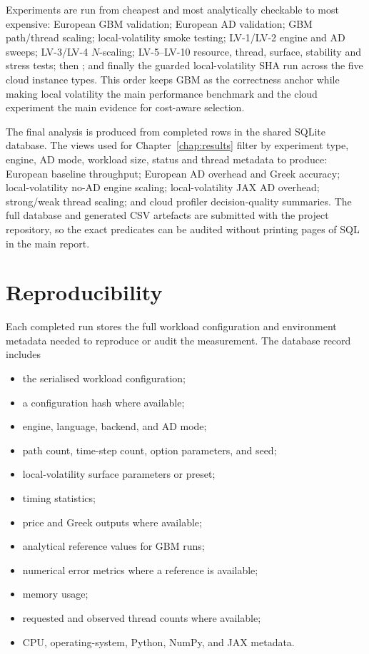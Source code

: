 Experiments are run from cheapest and most analytically checkable to most
expensive: European GBM validation; European AD validation; GBM path/thread
scaling; local-volatility smoke testing; LV-1/LV-2 engine and AD sweeps; LV-3/LV-4
\(N\)-scaling; LV-5--LV-10 resource, thread, surface, stability and stress tests;
then ; and finally the guarded local-volatility SHA
run across the five cloud instance types. This order keeps GBM as the correctness
anchor while making local volatility the main performance benchmark and the cloud
experiment the main evidence for cost-aware selection.

The final analysis is produced from completed rows in the shared SQLite database.
The views used for Chapter~\ref{chap:results} filter by experiment type, engine,
AD mode, workload size, status and thread metadata to produce: European baseline
throughput; European AD overhead and Greek accuracy; local-volatility no-AD
engine scaling; local-volatility JAX AD overhead; strong/weak thread scaling; and
cloud profiler decision-quality summaries. The full database and generated CSV
artefacts are submitted with the project repository, so the exact predicates can
be audited without printing pages of SQL in the main report.

\section{Reproducibility}
\label{sec:exp-reproducibility}

Each completed run stores the full workload configuration and environment
metadata needed to reproduce or audit the measurement.  The database record
includes

\begin{itemize}
    \item the serialised workload configuration;
    \item a configuration hash where available;
    \item engine, language, backend, and AD mode;
    \item path count, time-step count, option parameters, and seed;
    \item local-volatility surface parameters or preset;
    \item timing statistics;
    \item price and Greek outputs where available;
    \item analytical reference values for GBM runs;
    \item numerical error metrics where a reference is available;
    \item memory usage;
    \item requested and observed thread counts where available;
    \item CPU, operating-system, Python, NumPy, and JAX metadata.
\end{itemize}

